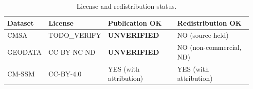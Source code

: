 \documentclass[11pt]{article}
\begin{document}
\begin{table}[htpb]
\centering
\caption{\label{tab:licenses}License and redistribution status.}
\begin{tabular}{l l l l}
\toprule
Dataset & License & Publication OK & Redistribution OK \\
\midrule
CMSA & TODO\_VERIFY & \textbf{UNVERIFIED} & NO (source-held) \\
GEODATA & CC-BY-NC-ND & \textbf{UNVERIFIED} & NO (non-commercial, ND) \\
CM-SSM & CC-BY-4.0 & YES (with attribution) & YES (with attribution) \\
\bottomrule
\end{tabular}
\end{table}

\end{document}
